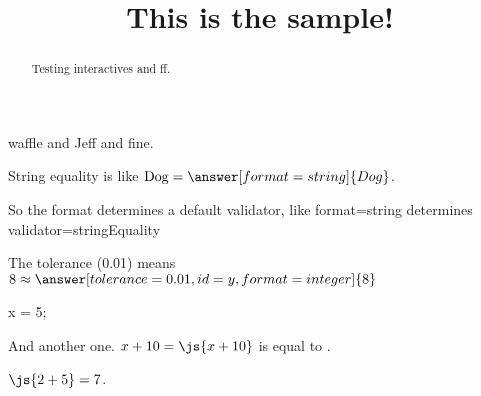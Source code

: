 \documentclass{ximera}
\title{This is the sample!}
\begin{document}
\begin{abstract}
Testing interactives and ff.
\end{abstract}

\maketitle

waffle and Jeff and fine.


\begin{problem}
  String equality is like $\mbox{Dog} = \answer[format=string]{Dog}$.

  So the format determines a default validator, like format=string determines validator=stringEquality
\end{problem}

\begin{problem}
  The tolerance (0.01) means $8 \approx \answer[tolerance=0.01,id=y,format=integer]{8}$
  
  \begin{feedback}[72]
  \end{feedback}
\end{problem}

\begin{javascript}
x = 5;
\end{javascript}

And another one.  $x + 10 = \js{x+10}$ is equal to .

$\js{2+5} = 7$.
\end{document}
